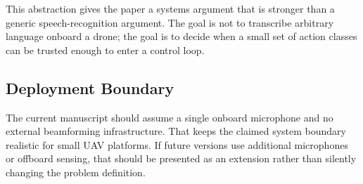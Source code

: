 This abstraction gives the paper a systems argument that is stronger than a generic speech-recognition argument. The goal is not to transcribe arbitrary language onboard a drone; the goal is to decide when a small set of action classes can be trusted enough to enter a control loop.

\subsection{Deployment Boundary}

The current manuscript should assume a single onboard microphone and no external beamforming infrastructure. That keeps the claimed system boundary realistic for small UAV platforms. If future versions use additional microphones or offboard sensing, that should be presented as an extension rather than silently changing the problem definition.

